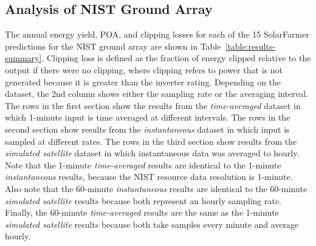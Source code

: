\documentclass[conference]{IEEEtran}
\begin{document}
\subsection{Analysis of NIST Ground Array}
The annual energy yield, POA, and clipping losses for each of the 15 SolarFarmer predictions for the NIST ground array are shown in Table~\ref{table:results-summary}. Clipping loss is defined as the fraction of energy clipped relative to the output if there were no clipping, where clipping refers to power that is not generated because it is greater than the inverter rating. Depending on the dataset, the 2nd column shows either the sampling rate or the averaging interval. The rows in the first section show the results from the \emph{time-averaged} dataset in which 1-minute input is time averaged at different intervals. The rows in the second section show results from the \emph{instantaneous} dataset in which input is sampled at different rates. The rows in the third section show results from the \emph{simulated satellite} dataset in which instantaneous data was averaged to hourly. Note that the 1-minute \emph{time-averaged} results are identical to the 1-minute \emph{instantaneous} results, because the NIST resource data resolution is 1-minute. Also note that the 60-minute \emph{instantaneous} results are identical to the 60-minute \emph{simulated satellite} results because both represent an hourly sampling rate. Finally, the 60-minute \emph{time-averaged} results are the same as the 1-minute \emph{simulated satellite} results because both take samples every minute and average hourly.
\end{document}
